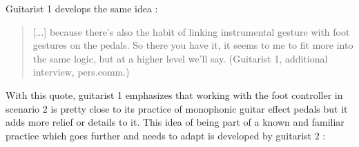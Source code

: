 \documentclass{article}
\begin{document}


Guitarist 1 develops the same idea :


\begin{quote}
[...] because there's also the habit of linking instrumental gesture with foot gestures on the pedals. So there you have it, it seems to me to fit more into the same logic, but at a higher level we'll say. (Guitarist 1, additional interview, pers.comm.)
\end{quote}

With this quote, guitarist 1 emphasizes that working with the foot controller in scenario 2 is pretty close to its practice of monophonic guitar effect pedals but it adds more relief or details to it. This idea of being part of a known and familiar practice which goes further and needs to adapt is developed by guitarist 2 : 
\end{document}
